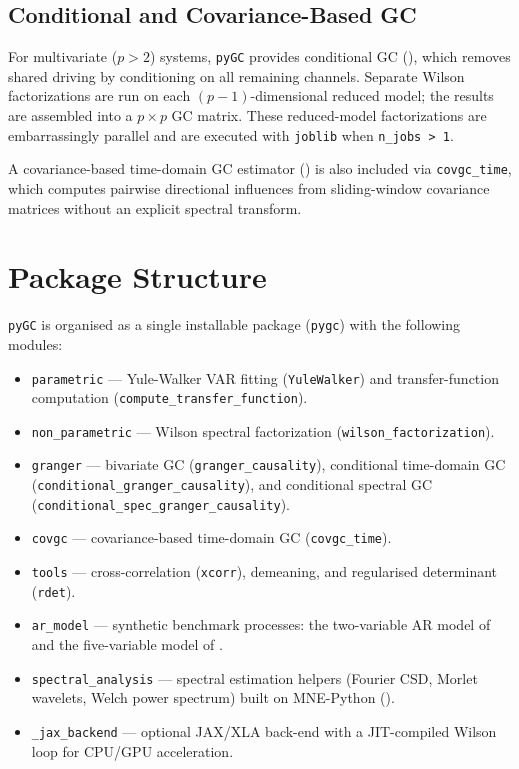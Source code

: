\documentclass[10pt,a4paper,onecolumn]{article}
\providecommand{\tightlist}{%
  \setlength{\itemsep}{0pt}\setlength{\parskip}{0pt}}
\begin{document}
\subsection{Conditional and Covariance-Based GC}\label{conditional}

For multivariate (\(p > 2\)) systems, \texttt{pyGC} provides conditional
GC (), which removes shared
driving by conditioning on all remaining channels. Separate Wilson
factorizations are run on each \((p{-}1)\)-dimensional reduced model;
the results are assembled into a \(p \times p\) GC matrix. These
reduced-model factorizations are embarrassingly parallel and are executed
with \texttt{joblib} when \texttt{n\_jobs > 1}.

A covariance-based time-domain GC estimator
() is also included via
\texttt{covgc\_time}, which computes pairwise directional influences from
sliding-window covariance matrices without an explicit spectral
transform.

\section{Package Structure}\label{package-structure}

\texttt{pyGC} is organised as a single installable package
(\texttt{pygc}) with the following modules:

\begin{itemize}
\tightlist
\item
  \texttt{parametric} --- Yule-Walker VAR fitting
  (\texttt{YuleWalker}) and transfer-function computation
  (\texttt{compute\_transfer\_function}).
\item
  \texttt{non\_parametric} --- Wilson spectral factorization
  (\texttt{wilson\_factorization}).
\item
  \texttt{granger} --- bivariate GC (\texttt{granger\_causality}),
  conditional time-domain GC
  (\texttt{conditional\_granger\_causality}), and conditional spectral
  GC (\texttt{conditional\_spec\_granger\_causality}).
\item
  \texttt{covgc} --- covariance-based time-domain GC
  (\texttt{covgc\_time}).
\item
  \texttt{tools} --- cross-correlation (\texttt{xcorr}), demeaning, and
  regularised determinant (\texttt{rdet}).
\item
  \texttt{ar\_model} --- synthetic benchmark processes: the
  two-variable AR model of  and the five-variable model of
  .
\item
  \texttt{spectral\_analysis} --- spectral estimation helpers
  (Fourier CSD, Morlet wavelets, Welch power spectrum) built on
  MNE-Python (\citeproc{ref-gramfort2013}{Gramfort et al., 2013}).
\item
  \texttt{\_jax\_backend} --- optional JAX/XLA back-end with a
  JIT-compiled Wilson loop for CPU/GPU acceleration.
\end{itemize}
\end{document}
